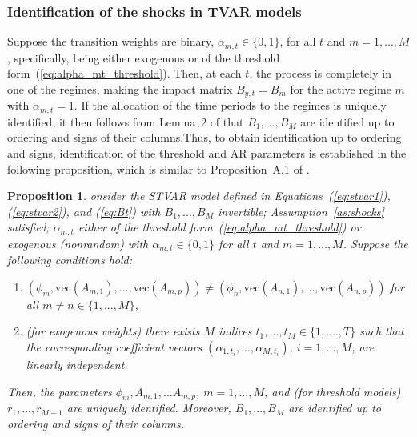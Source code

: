\documentclass[nojss]{jss}
\newtheorem{proposition}{Proposition}
\begin{document}
\subsubsection{Identification of the shocks in TVAR models}\label{sec:identtvar}

Suppose the transition weights are binary, $\alpha_{m,t}\in\lbrace 0, 1\rbrace$, for all $t$ and $m=1,...,M$, specifically, being either exogenous or of the threshold form~(\ref{eq:alpha_mt_threshold}). Then, at each $t$, the process is completely in one of the regimes, making the impact matrix $B_{y,t}=B_m$ for the active regime $m$ with $\alpha_{m,t}=1$. If the allocation of the time periods to the regimes is uniquely identified, it then follows from Lemma~2 of \cite{Virolainen2:2024} that $B_1,...,B_M$ are identified up to ordering and signs of their columns.Thus, to obtain identification up to ordering and signs, identification of the threshold and AR parameters is established in the following proposition, which is similar to Proposition~A.1 of \cite{Virolainen2:2024}.

\begin{proposition}\label{prop:tvar_ident}
onsider the STVAR model defined in Equations~(\ref{eq:stvar1}), (\ref{eq:stvar2}), and (\ref{eq:Bt}) with $B_1,...,B_M$ invertible; Assumption~\ref{as:shocks} satisfied; $\alpha_{m,t}$ either of the threshold form~(\ref{eq:alpha_mt_threshold}) or exogenous (nonrandom) with $\alpha_{m,t}\in\lbrace 0, 1\rbrace$ for all $t$ and $m=1,...,M$.
Suppose the following conditions hold:
\begin{enumerate}%
\item $(\phi_{m},\text{vec}(A_{m,1}),...,\text{vec}(A_{m,p})) \neq (\phi_{n},\text{vec}(A_{n,1}),...,\text{vec}(A_{n,p}))$ for all $m\neq n \in \lbrace 1,...,M\rbrace$,\label{cond:tvar_different_arpars}
\item (for exogenous weights) there exists $M$ indices $t_1,...,t_M\in\lbrace 1,....,T\rbrace$ such that the corresponding coefficient vectors $(\alpha_{1,t_i},...,\alpha_{M,t_i})$, $i=1,...,M$, are linearly independent.\label{cond:tvar_linind}
\end{enumerate}
Then, the parameters $\phi_{m},A_{m,1},...A_{m,p}$, $m=1,...,M$, and (for threshold models) $r_1,...,r_{M-1}$ are uniquely identified. Moreover, $B_1,...,B_M$ are identified up to ordering and signs of their columns.
\end{proposition}
\end{document}
